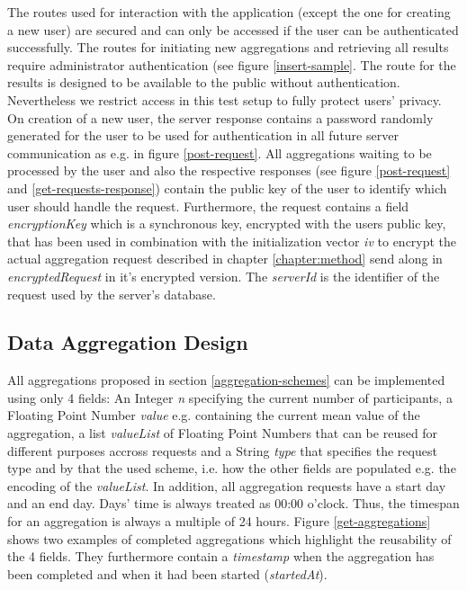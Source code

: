 
The routes used for interaction with the application (except the one for creating a new user) are secured and can only be accessed if the user can be authenticated successfully. The routes for initiating new aggregations and retrieving all results require administrator authentication (see figure \ref{insert-sample}. The route for the results is designed to be available to the public without authentication. Nevertheless we restrict access in this test setup to fully protect users' privacy.
On creation of a new user, the server response contains a password randomly generated for the user to be used for authentication in all future server communication as e.g. in figure \ref{post-request}. All aggregations waiting to be processed by the user and also the respective responses (see figure \ref{post-request} and \ref{get-requests-response}) contain the public key of the user to identify which user should handle the request. Furthermore, the request contains a field \textit{encryptionKey} which is a synchronous key, encrypted with the users public key, that has been used in combination with the initialization vector \textit{iv} to encrypt the actual aggregation request described in chapter \ref{chapter:method} send along in \textit{encryptedRequest} in it's encrypted version. The \textit{serverId} is the identifier of the request used by the server's database.


\subsection{Data Aggregation Design}\label{data-aggregation-design}
All aggregations proposed in section \ref{aggregation-schemes} can be implemented using only 4 fields: An Integer \textit{n} specifying the current number of participants, a Floating Point Number \textit{value} e.g. containing the current mean value of the aggregation, a list \textit{valueList} of Floating Point Numbers that can be reused for different purposes accross requests and a String \textit{type} that specifies the request type and by that the used scheme, i.e. how the other fields are populated e.g. the encoding of the \textit{valueList}. In addition, all aggregation requests have a start day and an end day. Days' time is always treated as 00:00 o'clock. Thus, the timespan for an aggregation is always a multiple of 24 hours. Figure \ref{get-aggregations} shows two examples of completed aggregations which highlight the reusability of the 4 fields. They furthermore contain a \textit{timestamp} when the aggregation has been completed and when it had been started (\textit{startedAt}).\\

